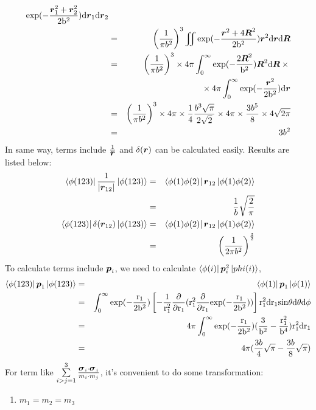 \documentclass[11pt]{article}
\newcommand{\bm}[1]{\mbox{\boldmath{$#1$}}}
\begin{document}
\begin{enumerate}
\begin{enumerate}
\begin{eqnarray}
\rm{exp}(-\frac{\bm{r}_{1}^2+\bm{r}_{2}^2}{2b^2}){\rm d}{\bm r}_1{}{\rm d}{\bm r}_2\nonumber\\
&=&\left(\frac{1}{\pi{}b^2}\right)^3\iint{}\rm{exp}(-\frac{\bm{r}^2+4\bm{R}^2}{2b^2})\bm{r}^2{\rm d}{\bm r}{\rm d}{\bm R}\nonumber\\
&=&\left(\frac{1}{\pi{}b^2}\right)^3\times{}4\pi\int_{0}^{\infty}\rm{exp}(-\frac{2{\bm{R}^2}}{b^2})\bm{R}^2{\rm d}{\bm R}\times{}
\nonumber\\
&&{}\times{}4\pi\int_{0}^{\infty}\rm{exp}(-\frac{\bm{r}^2}{2b^2}){\rm d}{\bm r}\nonumber\\
&=&\left(\frac{1}{\pi{}b^2}\right)^3\times{}4\pi\times\frac{1}{4}\frac{b^3\sqrt{\pi}}{2\sqrt{2}}\times{}4\pi\times
\frac{3b^5}{8}\times{}4\sqrt{2\pi}\nonumber\\
&=&3b^2
\end{eqnarray}
In same way, terms include $\frac{1}{\bm{r}}$ and $\delta(\bm{r})$ can be calculated easily. Results are listed below:
\begin{eqnarray}
\bra{\phi(123)}\frac{1}{|\bm{r}_{1 2}|}\ket{\phi(123)}&=&\bra{\phi(1)\phi(2)}\bm{r}_{1 2}\ket{\phi(1)\phi(2)}\nonumber\\
&=&\frac{1}{b}\sqrt{\frac{2}{\pi}}\\
\bra{\phi(123)}\delta(\bm{r}_{1 2})\ket{\phi(123)}&=&\bra{\phi(1)\phi(2)}\bm{r}_{1 2}\ket{\phi(1)\phi(2)}\nonumber\\
&=&\left(\frac{1}{2\pi{}b^2}\right)^{\frac{3}{2}}
\end{eqnarray}
To calculate terms include $\bm{p}_i$, we need to calculate $\bra{\phi(i)}\bm{p}_{i}^{2}\ket{phi(i)}$,
\begin{eqnarray}
\bra{\phi(123)}\bm{p}_{1}\ket{\phi(123)}&=&\bra{\phi(1)}\bm{p}_{1}\ket{\phi(1)}\nonumber\\
&=&\int_{0}^{\infty}\rm{exp}(-\frac{r_{1}}{2b^2})\left[-\frac{1}{r_{1}^2}\frac{\partial}{\partial r_1}(r_{1}^2\frac{\partial}{\partial r_1}
exp(-\frac{r_1}{2b^2}))\right]r_{1}^2\rm{d}r_{1}sin\theta\rm{d}\theta{}\rm{d}\phi\nonumber\\
&=&4\pi\int_{0}^{\infty}\rm{exp}(-\frac{r_{1}}{2b^2})(\frac{3}{b^2}-\frac{r_{1}^2}{b^4})r_{1}^2\rm{d}r_{1}\nonumber\\
&=&4\pi(\frac{3b}{4}\sqrt{\pi}-\frac{3b}{8}\sqrt{\pi})
\end{eqnarray}
For term like $\sum\limits_{i>j=1}^{3}\frac{\bm{\sigma}_i\cdot\bm{\sigma}_j}{m_i\cdot{}m_j}$, it's convenient to do some transformation:
\begin{enumerate}
\item $m_1=m_2=m_3$

\end{enumerate}
\end{enumerate}
\end{enumerate}
\end{document}

